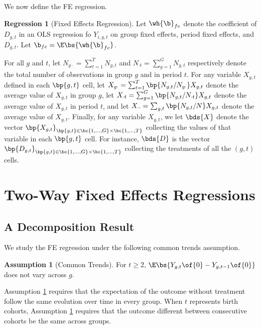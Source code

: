 \documentclass[12pt]{article}
\theoremstyle{definition}
\newtheorem{assumption}{Assumption}
\newtheorem{regression}{Regression}
\begin{document}
We now define the FE regression.

\begin{regression}[Fixed Effects Regression]
    Let $\wh{\b}_{fe}$ denote the coefficient of $D_{g,t}$ in an OLS regression fo $Y_{i,g,t}$ on group fixed effects, period fixed effects, and $D_{g,t}$. Let $\b_{fe} = \E\bs{\wh{\b}_{fe}}$.
\end{regression}

For all $g$ and $t$, let $N_{g\cdot} = \sum_{t=1}^{T} N_{g,t}$ and $N_{\cdot t} = \sum_{g=1}^{G} N_{g,t}$ respectively denote the total number of observations in group $g$ and in period $t$. For any variable $X_{g,t}$ defined in each $\bp{g,t}$ cell, let $X_{g\cdot} = \sum_{t=1}^{T} \bp{N_{g,t}/N_{g\cdot}} X_{g,t}$ denote the average value of $X_{g,t}$ in group $g$, let $X_{\cdot t} = \sum_{g=1}^{G} \bp{N_{g,t}/N_{\cdot t}} X_{g,t}$ denote the average value of $X_{g,t}$ in period $t$, and let $X_{\cdot\cdot} = \sum_{g,t} \bp{N_{g,t}/N} X_{g,t}$ denote the average value of $X_{g,t}$. Finally, for any variable $X_{g,t}$, we let $\bds{X}$ denote the vector $\bp{X_{g,t}}_{\bp{g, t} \in \bc{1, \ldots, G} \times \bc{1, \ldots, T}}$ collecting the values of that variable in each $\bp{g,t}$ cell. For instance, $\bds{D}$ is the vector $\bp{D_{g,t}}_{\bp{g, t} \in \bc{1, \ldots, G} \times \bc{1, \ldots, T}}$ collecting the treatments of all the $(g, t)$ cells.

\section{Two-Way Fixed Effects Regressions}

\subsection{A Decomposition Result}

We study the FE regression under the following common trends assumption. 

\begin{assumption}[Common Trends] \label{CT}
    For $t \geq 2$, $\E\bs{Y_{g,t}\of{0} - Y_{g,t-1}\of{0}}$ does not vary across $g$.
\end{assumption}

Assumption \ref{CT} requires that the expectation of the outcome without treatment follow the same evolution over time in every group. When $t$ represents birth cohorts, Assumption \ref{CT} requires that the outcome different between consecutive cohorts be the same across groups. 
\end{document}
